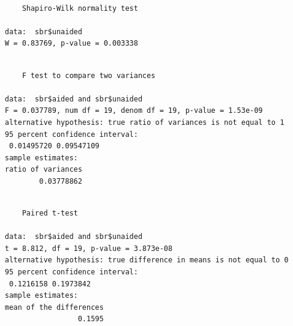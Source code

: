 \documentclass[
  letterpaper,
]{book}
\newenvironment{Shaded}{\begin{snugshade}}{\end{snugshade}}
\newcommand{\AttributeTok}[1]{\textcolor[rgb]{0.40,0.45,0.13}{#1}}
\newcommand{\CommentTok}[1]{\textcolor[rgb]{0.37,0.37,0.37}{#1}}
\newcommand{\ConstantTok}[1]{\textcolor[rgb]{0.56,0.35,0.01}{#1}}
\newcommand{\FunctionTok}[1]{\textcolor[rgb]{0.28,0.35,0.67}{#1}}
\newcommand{\NormalTok}[1]{\textcolor[rgb]{0.00,0.23,0.31}{#1}}
\newcommand{\SpecialCharTok}[1]{\textcolor[rgb]{0.37,0.37,0.37}{#1}}
\begin{document}
\begin{verbatim}

    Shapiro-Wilk normality test

data:  sbr$unaided
W = 0.83769, p-value = 0.003338
\end{verbatim}

\begin{Shaded}
\end{Shaded}

\begin{verbatim}

    F test to compare two variances

data:  sbr$aided and sbr$unaided
F = 0.037789, num df = 19, denom df = 19, p-value = 1.53e-09
alternative hypothesis: true ratio of variances is not equal to 1
95 percent confidence interval:
 0.01495720 0.09547109
sample estimates:
ratio of variances 
        0.03778862 
\end{verbatim}

\begin{Shaded}
\end{Shaded}

\begin{verbatim}

    Paired t-test

data:  sbr$aided and sbr$unaided
t = 8.812, df = 19, p-value = 3.873e-08
alternative hypothesis: true difference in means is not equal to 0
95 percent confidence interval:
 0.1216158 0.1973842
sample estimates:
mean of the differences 
                 0.1595 
\end{verbatim}

\begin{Shaded}
\end{Shaded}
\end{document}
